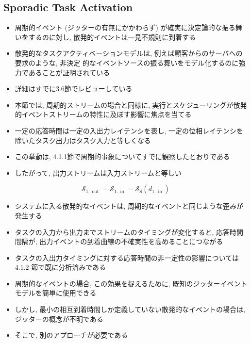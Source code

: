 \subsection{Sporadic Task Activation}
\label{ssec: sporadic task activation}

\begin{frame}{}
    \begin{itemize}
        \item 周期的イベント (ジッターの有無にかかわらず) が確実に決定論的な振る舞いをするのに対し, 散発的イベントは一見不規則に到着する
        \item 散発的なタスクアクティベーションモデルは, 例えば顧客からのサーバへの要求のような, 非決定 的なイベントソースの振る舞いをモデル化するのに強力であることが証明されている
        \item 詳細はすでに3.6節でレビューしている
        \item 本節では, 周期的ストリームの場合と同様に, 実行とスケジューリングが散発的イベントストリームの特性に及ぼす影響に焦点を当てる
    \end{itemize}
\end{frame}

\begin{frame}{}
    \begin{itemize}
        \item 一定の応答時間は一定の入出力レイテンシを表し, 一定の位相レイテンシを除いたタスク出力はタスク入力と等しくなる
        \item この挙動は, 4.1.1節で周期的事象についてすでに観察したとおりである
        \item したがって, 出力ストリームは入力ストリームと等しい

    \end{itemize}
    \begin{equation*}
        \mathcal{S}_{1, \text { out }}=\mathcal{S}_{1, \text { in }}=\mathcal{S}_{\mathrm{S}}\left(d_{1, \text { in }}^{-}\right)
    \end{equation*}
\end{frame}

\begin{frame}{}
    \begin{itemize}
        \item システムに入る散発的なイベントは, 周期的なイベントと同じような歪みが発生する
        \item タスクの入力から出力までストリームのタイミングが変化すると, 応答時間間隔が, 出力イベントの到着曲線の不確実性を高めることにつながる
        \item タスクの入出力タイミングに対する応答時間の非一定性の影響については 4.1.2 節で既に分析済みである
        \item 周期的なイベントの場合, この効果を捉えるために, 既知のジッターイベントモデルを簡単に使用できる
        \item しかし, 最小の相互到着時間しか定義していない散発的なイベントの場合は, ジッターの概念が不明である
        \item そこで, 別のアプローチが必要である
    \end{itemize}
\end{frame}

